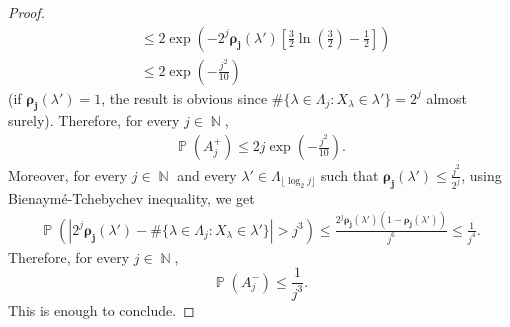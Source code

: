 \documentclass[a4paper,11pt,oneside]{article}
\DeclareMathOperator{\N}{\mathbb{N}}
\DeclareMathOperator{\prob}{\mathbb{P}}
\newcommand{\modu}[1]{\left\vert{#1}\right\vert}
\theoremstyle{definition}
\theoremstyle{plain}
\begin{document}
\begin{proof}
\begin{align*}
& \leq 2\exp\left(-2^j\bm{\rho_j}(\lambda')\left[\frac{3}{2}\ln\left(\frac{3}{2}\right)-\frac{1}{2}\right]\right) \\
& \leq 2\exp\left(-\frac{j^2}{10}\right)
\end{align*}
(if $\bm{\rho_j}(\lambda')=1$, the result is obvious since $\#\{\lambda\in\Lambda_j:X_\lambda\in\lambda'\}=2^j$ almost surely). Therefore, for every $j\in\N$,
\begin{align*}
\prob\left(A_j^+\right) 
\leq 2j\exp\left(-\frac{j^2}{10}\right).
\end{align*}
Moreover, for every $j\in\N$ and every $\lambda'\in\Lambda_{\lfloor\log_2j\rfloor}$ such that $\bm{\rho_j}(\lambda')\leq\frac{j^2}{2^j}$, using Bienaymé-Tchebychev inequality, we get
\begin{align*}
\prob\left(\modu{2^j\bm{\rho_j}(\lambda')-\#\{\lambda\in\Lambda_j:X_\lambda\in\lambda'\}}> j^3\right) \leq \frac{2^j\bm{\rho_j}(\lambda')(1-\bm{\rho_j}(\lambda'))}{j^6} \leq \frac{1}{j^4}.
\end{align*}
Therefore, for every $j\in\N$,
\[
\prob\left(A_j^-\right)\leq\frac{1}{j^3}.
\]
This is enough to conclude.
\end{proof}
\end{document}
